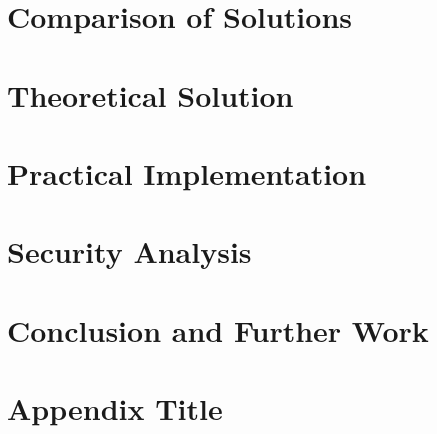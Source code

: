 \documentclass[10pt]{report}
\begin{document}
\chapter{Comparison of Solutions}

\chapter{Theoretical Solution}

\chapter{Practical Implementation}

\chapter{Security Analysis}

\chapter{Conclusion and Further Work}

\appendix
\chapter{Appendix Title}


\fi
\begin{sloppypar}
\printbibliography
\end{sloppypar}
\end{document}
